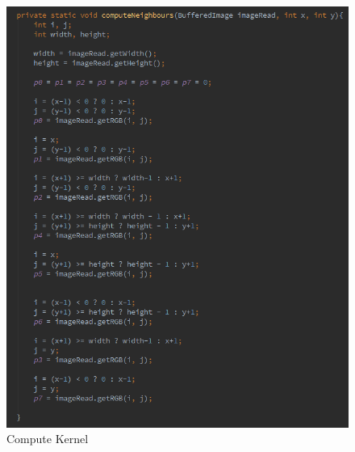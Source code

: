 \documentclass{article}
\begin{document}
%
%
\begin{figure}[H]
\centering

  \includegraphics[width=0.9\linewidth]{res/algorithms/computeNeighbours2.png}
  
\caption{Compute Kernel}
\label{fig:compute_neigh_sobel}
\end{figure}
\end{document}

